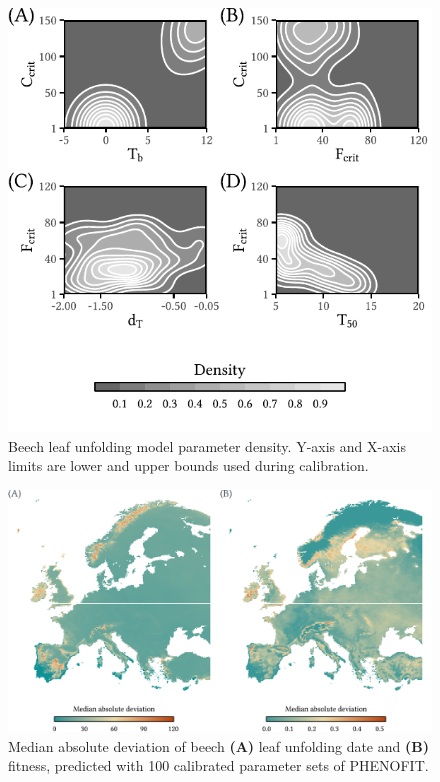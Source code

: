 \documentclass[11pt,]{article}
\begin{document}
\begin{figure}[H]

{\centering \includegraphics{figs/leafpardensity} 

}

\caption{Beech leaf unfolding model parameter density. Y-axis and X-axis limits are lower and upper bounds used during calibration.}\label{fig:leafpardensity}
\end{figure}

\begin{figure}[H]

{\centering \includegraphics{figs/consensusfitnessmap} 

}

\caption{Median absolute deviation of beech \textbf{(A)} leaf unfolding date and \textbf{(B)} fitness, predicted with 100 calibrated parameter sets of PHENOFIT.}\label{fig:consensusfitnessmap}
\end{figure}
\end{document}
